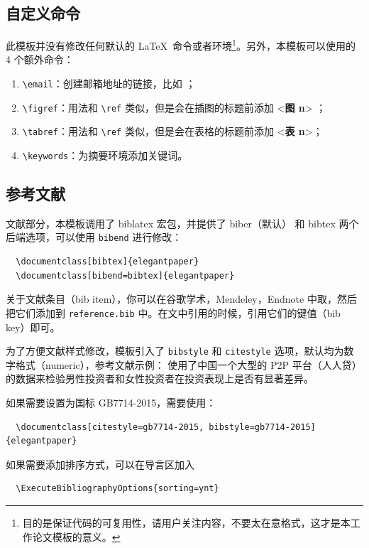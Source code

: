 \documentclass[lang=cn,a4paper,newtx]{elegantpaper}
\begin{document}
\subsection{自定义命令}
此模板并没有修改任何默认的 \LaTeX\ 命令或者环境\footnote{目的是保证代码的可复用性，请用户关注内容，不要太在意格式，这才是本工作论文模板的意义。}。另外，本模板可以使用的 4 个额外命令：
\begin{enumerate}
  \item \lstinline{\email}：创建邮箱地址的链接，比如 ；
  \item \lstinline{\figref}：用法和 \lstinline{\ref} 类似，但是会在插图的标题前添加 <\textbf{图 n}> ；
  \item \lstinline{\tabref}：用法和 \lstinline{\ref} 类似，但是会在表格的标题前添加 <\textbf{表 n}>；
  \item \lstinline{\keywords}：为摘要环境添加关键词。
\end{enumerate}

\subsection{参考文献}

文献部分，本模板调用了 biblatex 宏包，并提供了 biber（默认） 和 bibtex 两个后端选项，可以使用 \lstinline{bibend} 进行修改：

\begin{lstlisting}
  \documentclass[bibtex]{elegantpaper}
  \documentclass[bibend=bibtex]{elegantpaper}
\end{lstlisting}

关于文献条目（bib item），你可以在谷歌学术，Mendeley，Endnote 中取，然后把它们添加到 \lstinline{reference.bib} 中。在文中引用的时候，引用它们的键值（bib key）即可。

为了方便文献样式修改，模板引入了 \lstinline{bibstyle} 和 \lstinline{citestyle} 选项，默认均为数字格式（numeric），参考文献示例：\cite{cn1,en2,en3} 使用了中国一个大型的 P2P 平台（人人贷）的数据来检验男性投资者和女性投资者在投资表现上是否有显著差异。

如果需要设置为国标 GB7714-2015，需要使用：
\begin{lstlisting}
  \documentclass[citestyle=gb7714-2015, bibstyle=gb7714-2015]{elegantpaper} 
\end{lstlisting}

如果需要添加排序方式，可以在导言区加入
\begin{lstlisting}
  \ExecuteBibliographyOptions{sorting=ynt}
\end{lstlisting}
\end{document}
